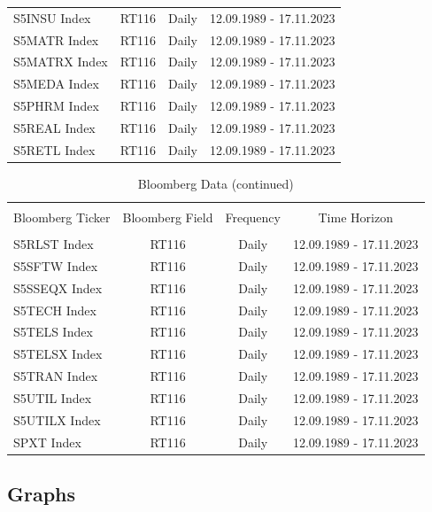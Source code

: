 \documentclass[a4paper,12pt,twoside]{article}
\begin{document}
\begin{table}[H]
\begin{tabular}{@{\extracolsep{12pt}} lccc}
S5INSU Index & RT116 & Daily & 12.09.1989 - 17.11.2023 \\
S5MATR Index & RT116 & Daily & 12.09.1989 - 17.11.2023 \\
S5MATRX Index & RT116 & Daily & 12.09.1989 - 17.11.2023 \\
S5MEDA Index & RT116 & Daily & 12.09.1989 - 17.11.2023 \\
S5PHRM Index & RT116 & Daily & 12.09.1989 - 17.11.2023 \\
S5REAL Index & RT116 & Daily & 12.09.1989 - 17.11.2023 \\
S5RETL Index & RT116 & Daily & 12.09.1989 - 17.11.2023 \\
   \hline
\end{tabular}
\label{tab_09a}
\end{table}

\begin{table}[H]
\ContinuedFloat
\caption*{Bloomberg Data (continued)}
\begin{tabular}{@{\extracolsep{12pt}} lccc}
\\[-1.8ex]\hline
\hline \\[-1.8ex]
Bloomberg Ticker & Bloomberg Field & Frequency & Time Horizon \\ 
\hline \\[-1.8ex]
S5RLST Index & RT116 & Daily & 12.09.1989 - 17.11.2023 \\
S5SFTW Index & RT116 & Daily & 12.09.1989 - 17.11.2023 \\
S5SSEQX Index & RT116 & Daily & 12.09.1989 - 17.11.2023 \\
S5TECH Index & RT116 & Daily & 12.09.1989 - 17.11.2023 \\
S5TELS Index & RT116 & Daily & 12.09.1989 - 17.11.2023 \\
S5TELSX Index & RT116 & Daily & 12.09.1989 - 17.11.2023 \\
S5TRAN Index & RT116 & Daily & 12.09.1989 - 17.11.2023 \\
S5UTIL Index & RT116 & Daily & 12.09.1989 - 17.11.2023 \\
S5UTILX Index & RT116 & Daily & 12.09.1989 - 17.11.2023 \\
SPXT Index & RT116 & Daily & 12.09.1989 - 17.11.2023 \\
   \hline
\end{tabular}
\label{tab_09b}
\end{table}

\newpage
\subsection{Graphs}
\end{document}
